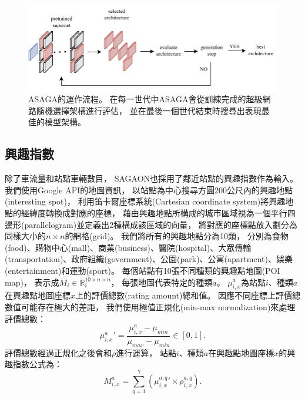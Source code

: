 \documentclass[a4paper,14pt]{extarticle}
\begin{document}
            \begin{figure}[htb]
                \includegraphics[width=\textwidth]{flow.pdf}
                \caption{
                    {\fontsize{12pt}{10pt}\selectfont
                        ASAGA的運作流程。
                        在每一世代中ASAGA會從訓練完成的超級網路隨機選擇架構進行評估，
                        並在最後一個世代結束時搜尋出表現最佳的模型架構。
                    }
                }
                \label{fig:ASAGA}
            \end{figure}

        \subsection{興趣指數}
            \label{subsec:point_of_interest}
            除了車流量和站點車輛數目，
            SAGAON也採用了鄰近站點的興趣指數作為輸入。
            我們使用Google API的地圖資訊，
            以站點為中心搜尋方圓200公尺內的興趣地點(interesting spot)，
            利用笛卡爾座標系統(Cartesian coordinate system)將興趣地點的經緯度轉換成對應的座標，
            藉由興趣地點所構成的城市區域視為一個平行四邊形(parallelogram)並定義出2種構成該區域的向量，
            將對應的座標點放入劃分為同樣大小的$n \times n$的網格(grid)。
            我們將所有的興趣地點分為10類，
            分別為食物(food)、購物中心(mall)、商業(business)、醫院(hospital)、大眾傳輸(transportation)、政府組織(government)、公園(park)、公寓(apartment)、娛樂(entertainment)和運動(sport)。
            每個站點有10張不同種類的興趣點地圖(POI map)，
            表示成$M_i \in \mathbb{R}_i^{10 \times n\times n}$，
            每張地圖代表特定的種類$a$。
            $\mu_{i,x}^a$為站點$i$、種類$a$在興趣點地圖座標$x$上的評價總數(rating amount)總和值。
            因應不同座標上評價總數值可能存在極大的差距，
            我們使用極值正規化(min-max normalization)來處理評價總數：
            \begin{equation}
                {\mu_{i,x}^a}' = \frac{\mu_{i,x}^a - \mu_{min}}{\mu_{max} - \mu_{min}} \in [0,1].
            \end{equation}
            評價總數經過正規化之後會和$\rho$進行運算，
            站點$i$、種類$a$在興趣點地圖座標$x$的興趣指數公式為：
            \begin{equation}
                M_{i,x}^a = \sum_{q=1}^{\gamma} ({\mu_{i,x}^{a,q}}' \times \rho_{i,x}^{a,q}).
            \end{equation}
\end{document}
